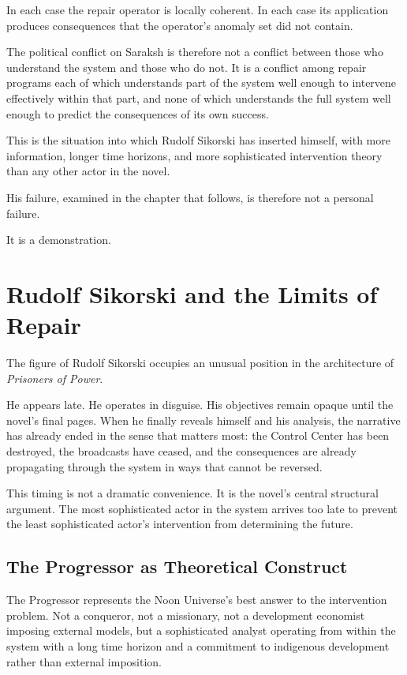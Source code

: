 \documentclass[12pt, a4paper]{article}
\theoremstyle{plain}
\theoremstyle{definition}
\theoremstyle{remark}
\begin{document}
In each case the repair operator is locally
coherent. In each case its application produces
consequences that the operator's anomaly set
did not contain.

The political conflict on Saraksh is therefore
not a conflict between those who understand the
system and those who do not. It is a conflict
among repair programs each of which understands
part of the system well enough to intervene
effectively within that part, and none of which
understands the full system well enough to
predict the consequences of its own success.

This is the situation into which Rudolf Sikorski
has inserted himself, with more information,
longer time horizons, and more sophisticated
intervention theory than any other actor in
the novel.

His failure, examined in the chapter that follows,
is therefore not a personal failure.

It is a demonstration.

\section{Rudolf Sikorski and the Limits of Repair}

The figure of Rudolf Sikorski occupies an unusual
position in the architecture of \textit{Prisoners
of Power}.

He appears late. He operates in disguise. His
objectives remain opaque until the novel's final
pages. When he finally reveals himself and his
analysis, the narrative has already ended in the
sense that matters most: the Control Center has
been destroyed, the broadcasts have ceased, and
the consequences are already propagating through
the system in ways that cannot be reversed.

This timing is not a dramatic convenience. It is
the novel's central structural argument. The most
sophisticated actor in the system arrives too late
to prevent the least sophisticated actor's
intervention from determining the future.

\subsection{The Progressor as Theoretical Construct}

The Progressor represents the Noon Universe's
best answer to the intervention problem. Not a
conqueror, not a missionary, not a development
economist imposing external models, but a
sophisticated analyst operating from within the
system with a long time horizon and a commitment
to indigenous development rather than external
imposition.
\end{document}
